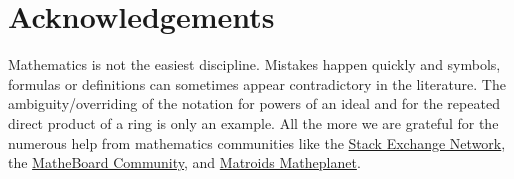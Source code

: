 \chapter*{Acknowledgements}
\vspace{0.8cm}

Mathematics is not the easiest discipline. Mistakes happen quickly and symbols, formulas or definitions can sometimes appear contradictory in the literature. The ambiguity/overriding of the notation for powers of an ideal and for the repeated direct product of a ring is only an example. All the more we are grateful for the numerous help from mathematics communities like the \hyperlink{https://math.stackexchange.com/}{Stack Exchange Network}, the \hyperlink{https://www.matheboard.de/}{MatheBoard Community}, and \hyperlink{https://matheplanet.com/}{Matroids Matheplanet}.